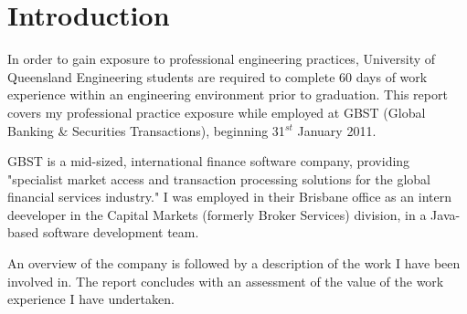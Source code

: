 \chapter{Introduction}

In order to gain exposure to professional engineering practices, University of Queensland Engineering students are required to complete 60 days of work experience within an engineering environment prior to graduation. This report covers my professional practice exposure while employed at GBST (Global Banking \& Securities Transactions), beginning 31$^{st}$ January 2011.

GBST is a mid-sized, international finance software company, providing "specialist market access and transaction processing solutions for the global financial services industry." \cite{asx} I was employed in their Brisbane office as an intern deeveloper in the Capital Markets (formerly Broker Services) division, in a Java-based software development team.

An overview of the company is followed by a description of the work I have been involved in. The report concludes with an assessment of the value of the work experience I have undertaken.

\begin{comment}
lorem ipsum blah blah blah
\end{comment}
